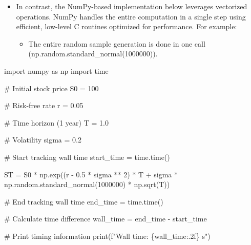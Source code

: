 \documentclass[
  letterpaper,
  DIV=11,
  numbers=noendperiod]{scrreprt}
\newenvironment{Shaded}{\begin{snugshade}}{\end{snugshade}}
\newcommand{\BuiltInTok}[1]{\textcolor[rgb]{0.00,0.23,0.31}{#1}}
\newcommand{\CommentTok}[1]{\textcolor[rgb]{0.37,0.37,0.37}{#1}}
\newcommand{\DecValTok}[1]{\textcolor[rgb]{0.68,0.00,0.00}{#1}}
\newcommand{\FloatTok}[1]{\textcolor[rgb]{0.68,0.00,0.00}{#1}}
\newcommand{\ImportTok}[1]{\textcolor[rgb]{0.00,0.46,0.62}{#1}}
\newcommand{\NormalTok}[1]{\textcolor[rgb]{0.00,0.23,0.31}{#1}}
\newcommand{\OperatorTok}[1]{\textcolor[rgb]{0.37,0.37,0.37}{#1}}
\newcommand{\SpecialCharTok}[1]{\textcolor[rgb]{0.37,0.37,0.37}{#1}}
\newcommand{\SpecialStringTok}[1]{\textcolor[rgb]{0.13,0.47,0.30}{#1}}
\providecommand{\tightlist}{%
  \setlength{\itemsep}{0pt}\setlength{\parskip}{0pt}}\usepackage{longtable,booktabs,array}
\begin{document}
\begin{itemize}
\tightlist
\item
  In contrast, the NumPy-based implementation below leverages vectorized
  operations. NumPy handles the entire computation in a single step
  using efficient, low-level C routines optimized for performance. For
  example:

  \begin{itemize}
  \tightlist
  \item
    The entire random sample generation is done in one call
    (np.random.standard\_normal(1000000)).
  \end{itemize}
\end{itemize}

\begin{Shaded}
\begin{Highlighting}[]
\ImportTok{import}\NormalTok{ numpy }\ImportTok{as}\NormalTok{ np}
\ImportTok{import}\NormalTok{ time }

\CommentTok{\# Initial stock price}
\NormalTok{S0 }\OperatorTok{=} \DecValTok{100} 

\CommentTok{\# Risk{-}free rate}
\NormalTok{r }\OperatorTok{=} \FloatTok{0.05} 

\CommentTok{\# Time horizon (1 year)}
\NormalTok{T }\OperatorTok{=} \FloatTok{1.0} 

\CommentTok{\# Volatility}
\NormalTok{sigma }\OperatorTok{=} \FloatTok{0.2} 

\CommentTok{\# Start tracking wall time}
\NormalTok{start\_time }\OperatorTok{=}\NormalTok{ time.time()}

\NormalTok{ST }\OperatorTok{=}\NormalTok{ S0 }\OperatorTok{*}\NormalTok{ np.exp((r }\OperatorTok{{-}} \FloatTok{0.5} \OperatorTok{*}\NormalTok{ sigma }\OperatorTok{**} \DecValTok{2}\NormalTok{) }\OperatorTok{*}\NormalTok{ T }\OperatorTok{+}
\NormalTok{    sigma }\OperatorTok{*}\NormalTok{ np.random.standard\_normal(}\DecValTok{1000000}\NormalTok{) }\OperatorTok{*}\NormalTok{ np.sqrt(T))}

\CommentTok{\# End tracking wall time}
\NormalTok{end\_time }\OperatorTok{=}\NormalTok{ time.time()}

\CommentTok{\# Calculate time difference}
\NormalTok{wall\_time }\OperatorTok{=}\NormalTok{ end\_time }\OperatorTok{{-}}\NormalTok{ start\_time}

\CommentTok{\# Print timing information}
\BuiltInTok{print}\NormalTok{(}\SpecialStringTok{f"Wall time: }\SpecialCharTok{\{}\NormalTok{wall\_time}\SpecialCharTok{:.2f\}}\SpecialStringTok{ s"}\NormalTok{)}
\end{Highlighting}
\end{Shaded}
\end{document}
